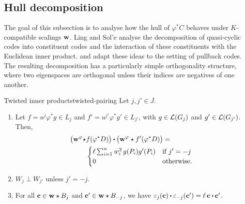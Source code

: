 \documentclass[twocolumn, 11pt]{scrartcl}
\begin{document}
\subsection{Hull decomposition} \label{subsection:hull-decomposition}

The goal of this subsection is to analyse how the hull of $\varphi^*C$ behaves under $K$-compatible scalings $\mathbf{w}$. Ling and Sol'e \cite[Prop.~4.1]{ling2001algebraic} analyse the decomposition of quasi-cyclic codes into constituent codes and the interaction of these constituents with the Euclidean inner product.  and  adapt these ideas to the setting of pullback codes. The resulting decomposition has a particularly simple orthogonality structure, where two eigenspaces are orthogonal unless their indices are negatives of one another.

\begin{lemma}{Twisted inner products}{twisted-pairing}
    Let $j,j'\in J$.
    \begin{enumerate}[label={(\alph*)}, left=-4pt, topsep=2pt, itemsep=0pt]
        \item \label{enum:tp-formula} Let $f=u^j\varphi^*g\in L_j$ and $f'=u^{j'}\varphi^*g'\in L_{j'}$, with $g\in\mathcal{L}(G_j)$ and $g'\in\mathcal{L}(G_{j'})$. Then,
        \begin{align*}
            \pa[\big]{\bfw^\varphi \star &f(\varphi^*D)} \dotpr \pa[\big]{\bfw^\varphi\star f'(\varphi^*D)}= \\
            &\begin{cases}
            \textstyle \ell\sum_{i=1}^n w_i^2\,g(P_i)g'(P_i) &\text{if }j'=-j \\
            0 &\text{otherwise.}
            \end{cases}
        \end{align*}
        \item \label{enum:tp-orth} $W_j\perp W_{j'}$ unless $j'=-j$.
        \item \label{enum:tp-eps} For all $\mathbf{c}\in\mathbf{w}\star B_j$ and $\mathbf{c}'\in\mathbf{w}\star B_{-j}$, we have $\eps_j(\bfc)\dotpr\eps_{-j}(\bfc')=\ell\,\bfc\dotpr\bfc'$.
    \end{enumerate}
\end{lemma}
\end{document}
